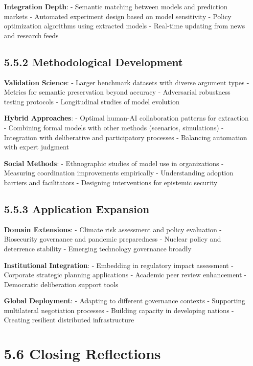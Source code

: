 \documentclass[
  11pt,
  letterpaper,
]{book}
\begin{document}
\textbf{Integration Depth}: - Semantic matching between models and
prediction markets - Automated experiment design based on model
sensitivity - Policy optimization algorithms using extracted models -
Real-time updating from news and research feeds

\subsection*{5.5.2 Methodological
Development}\label{sec-methodological-development}

\textbf{Validation Science}: - Larger benchmark datasets with diverse
argument types - Metrics for semantic preservation beyond accuracy -
Adversarial robustness testing protocols - Longitudinal studies of model
evolution

\textbf{Hybrid Approaches}: - Optimal human-AI collaboration patterns
for extraction - Combining formal models with other methods (scenarios,
simulations) - Integration with deliberative and participatory processes
- Balancing automation with expert judgment

\textbf{Social Methods}: - Ethnographic studies of model use in
organizations - Measuring coordination improvements empirically -
Understanding adoption barriers and facilitators - Designing
interventions for epistemic security

\subsection*{5.5.3 Application
Expansion}\label{sec-application-expansion}

\textbf{Domain Extensions}: - Climate risk assessment and policy
evaluation - Biosecurity governance and pandemic preparedness - Nuclear
policy and deterrence stability - Emerging technology governance broadly

\textbf{Institutional Integration}: - Embedding in regulatory impact
assessment - Corporate strategic planning applications - Academic peer
review enhancement - Democratic deliberation support tools

\textbf{Global Deployment}: - Adapting to different governance contexts
- Supporting multilateral negotiation processes - Building capacity in
developing nations - Creating resilient distributed infrastructure

\section*{5.6 Closing Reflections}\label{sec-closing-reflections}
\end{document}
